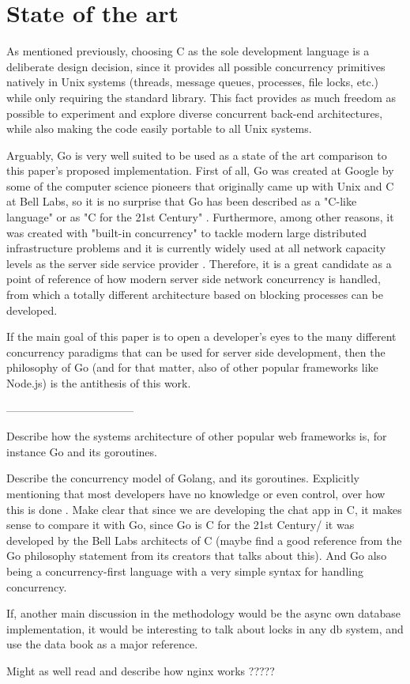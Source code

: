 \section{State of the art}
As mentioned previously, choosing C as the sole development language is a deliberate design decision, since it provides all possible concurrency primitives natively in Unix systems (threads, message queues, processes, file locks, etc.) while only requiring the standard library. This fact provides as much freedom as possible to experiment and explore diverse concurrent back-end architectures, while also making the code easily portable to all Unix systems.

Arguably, Go is very well suited to be used as a state of the art comparison to this paper's proposed implementation. First of all, Go was created at Google by some of the computer science pioneers that originally came up with Unix and C at Bell Labs, so it is no surprise that Go has been described as a "C-like language" or as "C for the 21st Century" \cite{GoPL2015}. Furthermore, among other reasons, it was created with "built-in concurrency" to tackle modern large distributed infrastructure problems and it is currently widely used at all network capacity levels as the server side service provider \cite{Pike2012}. Therefore, it is a great candidate as a point of reference of how modern server side network concurrency is handled, from which a totally different architecture based on blocking processes can be developed. 

If the main goal of this paper is to open a developer's eyes to the many different concurrency paradigms that can be used for server side development, then the philosophy of Go (and for that matter, also of other popular frameworks like Node.js) is the antithesis of this work.

-----------------------------------

Describe how the systems architecture of other popular web frameworks is, for instance Go and its goroutines.

Describe the concurrency model of Golang, and its goroutines. Explicitly mentioning that most developers have no knowledge or even control, over how this is done \cite{Cox-Buday2017}. Make clear that since we are developing the chat app in C, it makes sense to compare it with Go, since Go is C for the 21st Century/ it was developed by the Bell Labs architects of C (maybe find a good reference from the Go philosophy statement from its creators that talks about this). And Go also being a concurrency-first language with a very simple syntax for handling concurrency.

If, another main discussion in the methodology would be the async own database implementation, it would be interesting to talk about locks in any db system, and use the data book as a major reference.

Might as well read and describe how nginx works ?????
